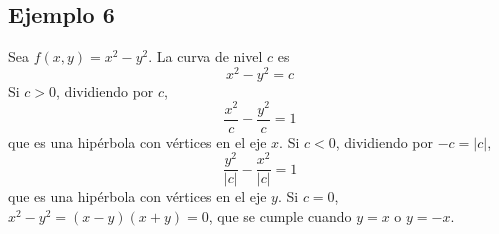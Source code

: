 \documentclass{article}
\begin{document}
\subsection*{Ejemplo 6}

Sea \(f(x,y)=x^2-y^2\). La curva de nivel \(c\) es
\[
x^2-y^2=c
\]
Si \(c>0\), dividiendo por \(c\),
\[
\frac{x^2}{c}-\frac{y^2}{c}=1
\]
que es una hipérbola con vértices en el eje \(x\). Si \(c<0\), dividiendo por \(-c=|c|\),
\[
\frac{y^2}{|c|}-\frac{x^2}{|c|}=1
\]
que es una hipérbola con vértices en el eje \(y\). Si \(c=0\), \(x^2-y^2=(x-y)(x+y)=0\), que se cumple cuando \(y=x\) o \(y=-x\).

\end{document}
